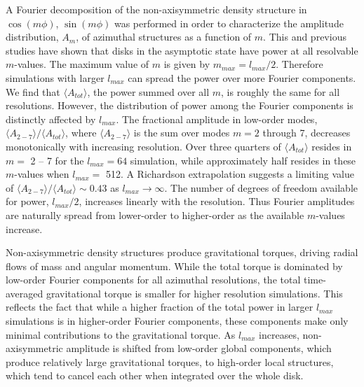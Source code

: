 \documentclass[manuscript]{aastex}
\begin{document}
A Fourier decomposition of the non-axisymmetric density structure in $\cos(m\phi)$, $\sin(m\phi)$ was
performed in order to characterize the amplitude distribution, $A_m$, of azimuthal structures as a function of
$m$.  This and previous studies have shown that disks in the asymptotic state have power at all resolvable
$m$-values.  The maximum value of $m$ is given by $m_{max} = l_{max}/2$.  Therefore simulations with larger
$l_{max}$ can spread the power over more Fourier components.  We find that $\langle A_{tot} \rangle$, the
power summed over all $m$, is roughly the same for all resolutions.  However, the distribution of power among
the Fourier components is distinctly affected by $l_{max} $.
The fractional amplitude in low-order modes, $\langle A_{2-7} \rangle / \langle A_{tot} \rangle$, where
$\langle A_{2-7} \rangle$ is the sum over modes $m = 2$ through 7, decreases monotonically with increasing
resolution.  Over three quarters of $\langle A_{tot} \rangle$ resides in $m =$ 2 -- 7 for the $l_{max} = 64$
simulation, while approximately half resides in these $m$-values when $l_{max} =$ 512.  A Richardson
extrapolation suggests a limiting value of $\langle A_{2-7} \rangle / \langle A_{tot} \rangle \sim 0.43$ as
$l_{max}\rightarrow \infty$.  The number of degrees of freedom available for power, $l_{max}/2$, increases
linearly with the resolution.  Thus Fourier amplitudes are naturally spread from lower-order to higher-order
as the available $m$-values increase.

Non-axisymmetric density structures produce gravitational torques, driving radial flows of mass and angular momentum.   While the total torque is dominated by low-order Fourier components for all azimuthal resolutions, the total
time-averaged gravitational torque  is smaller for higher resolution simulations.   This reflects the fact that while a higher fraction of the total power in larger $l_{max}$ simulations is in higher-order Fourier components, these components make only minimal contributions to the gravitational torque. As $l_{max}$ increases, non-axisymmetric amplitude is shifted from low-order global components, which produce relatively large gravitational torques, to high-order local structures, which tend to cancel each other when integrated over the whole disk. 
\end{document}
